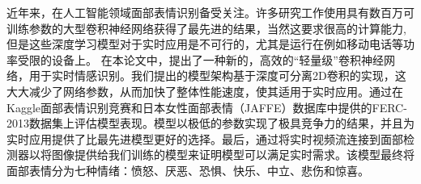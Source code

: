 \documentclass[master]{thesis-uestc}
\begin{document}
\begin{chineseabstract}
近年来，在人工智能领域面部表情识别备受关注。许多研究工作使用具有数百万可训练参数的大型卷积神经网络获得了最先进的结果，当然这要求很高的计算能力, 但是这些深度学习模型对于实时应用是不可行的，尤其是运行在例如移动电话等功率受限的设备上。
在本论文中，提出了一种新的，高效的“轻量级”卷积神经网络，用于实时情感识别。我们提出的模型架构基于深度可分离2D卷积的实现，这大大减少了网络参数，从而加快了整体性能速度，使其适用于实时应用。通过在Kaggle面部表情识别竞赛和日本女性面部表情（JAFFE）数据库中提供的FERC-2013数据集上评估模型表现。模型以极低的参数实现了极具竞争力的结果，并且为实时应用提供了比最先进模型更好的选择。最后，通过将实时视频流连接到面部检测器以将图像提供给我们训练的模型来证明模型可以满足实时需求。该模型最终将面部表情分为七种情绪：愤怒、厌恶、恐惧、快乐、中立、悲伤和惊喜。

\end{chineseabstract}
\end{document}
